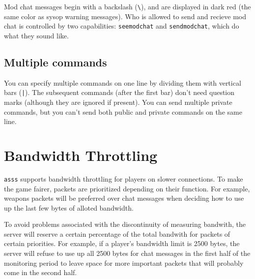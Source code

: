 \documentclass{article}
\newcommand{\asss}{\texttt{asss}}
\begin{document}
Mod chat messages begin with a backslash (\verb/\/), and are displayed
in dark red (the same color as sysop warning messages). Who is allowed
to send and recieve mod chat is controlled by two capabilities:
\texttt{seemodchat} and \texttt{sendmodchat}, which do what they sound
like.


\subsection{Multiple commands}

You can specify multiple commands on one line by dividing them with
vertical bars (\verb/|/). The subsequent commands (after the first bar)
don't need question marks (although they are ignored if present). You
can send multiple private commands, but you can't send both public and
private commands on the same line.


\section{Bandwidth Throttling}

\asss{} supports bandwidth throttling for players on slower connections.
To make the game fairer, packets are prioritized depending on their
function. For example, weapons packets will be preferred over chat
messages when deciding how to use up the last few bytes of alloted
bandwidth.

To avoid problems associated with the discontinuity of measuring
bandwith, the server will reserve a certain percentage of the total
bandwith for packets of certain priorities. For example, if a player's
bandwidth limit is 2500 bytes, the server will refuse to use up all 2500
bytes for chat messages in the first half of the monitoring period to
leave space for more important packets that will probably come in the
second half.



%
%
%
%
\end{document}
